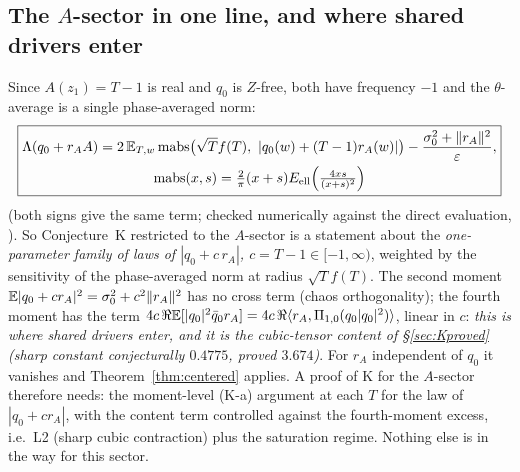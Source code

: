 \subsection{The $A$-sector in one line, and where shared drivers enter}\label{sec:Aline}
Since $A(z_1)=T-1$ is real and $q_0$ is $Z$-free, both have frequency $-1$ and the $\theta$-average is a single phase-averaged norm:
\begin{equation}\label{eq:Aline}
\boxed{\begin{gathered}\Lambda(q_0+r_AA)=2\,\E_{T,w}\,\mathrm{mabs}\bigl(\sqrt T f(T),\ |q_0(w)+(T-1)r_A(w)|\bigr)-\frac{\sigma_0^2+\|r_A\|^2}\varepsilon,\\
\mathrm{mabs}(x,s)=\tfrac2\pi(x+s)E_{\rm ell}\Bigl(\tfrac{4xs}{(x+s)^2}\Bigr)\end{gathered}}
\end{equation}
(both signs give the same term; checked numerically against the direct evaluation, ). So Conjecture~K restricted to the $A$-sector is a statement about the
\emph{one-parameter family of laws of $|q_0+c\,r_A|$, $c=T-1\in[-1,\infty)$}, weighted by the sensitivity of the phase-averaged norm at radius $\sqrt Tf(T)$. The second moment
$\mathbb E|q_0+cr_A|^2=\sigma_0^2+c^2\|r_A\|^2$ has no cross term (chaos orthogonality); the fourth moment has the term $4c\,\Re\mathbb E[|q_0|^2\bar q_0r_A]=4c\,\Re\langle r_A,\Pi_{1,0}(q_0|q_0|^2)\rangle$, linear in $c$:
\emph{this is where shared drivers enter, and it is the cubic-tensor content of \S\ref{sec:Kproved} (sharp constant conjecturally $0.4775$, proved $3.674$)}. For $r_A$ independent of
$q_0$ it vanishes and Theorem~\ref{thm:centered} applies. A proof of K for the $A$-sector therefore needs: the moment-level (K-a) argument at each $T$ for the law of $|q_0+cr_A|$,
with the content term controlled against the fourth-moment excess, i.e.\ L2 (sharp cubic contraction) plus the saturation regime. Nothing else is in the way for this sector.

